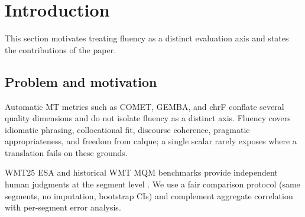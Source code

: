 \documentclass[11pt]{article}
\newcommand{\FS}{FluencyScore}
\begin{document}
\begin{abstract}
Our hypotheses for the structured framework therefore concern its outputs rather
than its score, and the largest confirmed return is diagnostic.
For every segment, \FS{} produces a complete error record: an issue type from a
fixed taxonomy, a severity level, the exact problem phrase, and a suggested fix.
In addition, the structured variant is substantially more stable under a change of
judge, varying within a $0.022$ Spearman range across four backbones against
$0.128$ for a flat single-score variant of the same rubric, and its per-pair
behavior is predictable from typological distance.
Further framework gains (calibration, sub-dimension weighting, language-pair
routing) remain hypotheses under active test.

The relevant question for LLM-based evaluation is thus shifting: well-prompted
judges already match human judgment up to annotation noise, so the value of an
evaluation lies in what it returns at that level of accuracy, and in whether those
returns persist when the underlying model changes.
\FS{} is designed for this setting.
\end{abstract}

\section{Introduction}
This section motivates treating fluency as a distinct evaluation axis and states the contributions of the paper.
\subsection{Problem and motivation}
Automatic MT metrics such as COMET, GEMBA, and chrF conflate several quality
dimensions and do not isolate fluency as a distinct axis.
Fluency covers idiomatic phrasing, collocational fit, discourse coherence,
pragmatic appropriateness, and freedom from calque; a single scalar rarely
exposes where a translation fails on these grounds.

WMT25 ESA and historical WMT MQM benchmarks provide independent human judgments
at the segment level \cite{kocmi-etal-2024-esa,kocmi-etal-2025-wmt25}.
We use a fair comparison protocol (same segments, no imputation, bootstrap CIs)
and complement aggregate correlation with per-segment error analysis.
\end{document}
